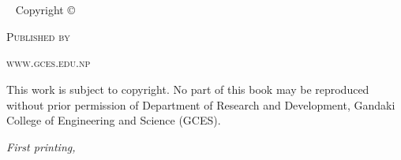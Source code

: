 \chapter*{}
\keepvalues
~\vfill
\thispagestyle{empty}
\setlength{\parindent}{0pt}
\setlength{\parskip}{\baselineskip}
Copyright \copyright\ \the\year\ 

\par \textsc{Published by }

\par \textsc{www.gces.edu.np}

\par This work is subject to copyright. No part of this book may be reproduced without prior permission of Department of Research and Development, Gandaki College of Engineering and Science (GCES).

\par\textit{First printing, \monthyear}
\restorevalues
